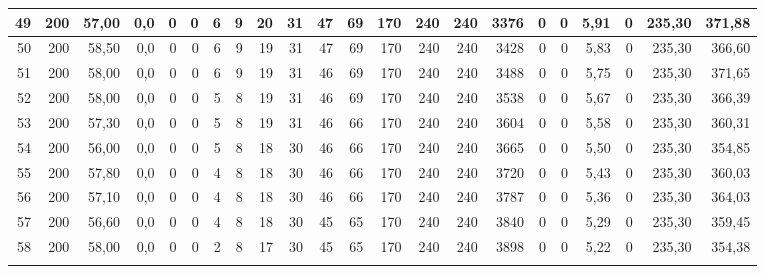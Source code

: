 \begin{appendices}
\begin{table}[H]
{\begin{tabular}{rrrrrrrrrrrrrrrrrrrrrr}
      49 & 200 & 57{,}00 & 0{,}0 & 0  & 0  & 6  & 9  & 20 & 31 & 47  & 69  & 170 & 240 & 240 & 3376 & 0 & 0  & 5{,}91  & 0 & 235{,}30 & 371{,}88 \\ \hline
      50 & 200 & 58{,}50 & 0{,}0 & 0  & 0  & 6  & 9  & 19 & 31 & 47  & 69  & 170 & 240 & 240 & 3428 & 0 & 0  & 5{,}83  & 0 & 235{,}30 & 366{,}60 \\ \hline
      51 & 200 & 58{,}00 & 0{,}0 & 0  & 0  & 6  & 9  & 19 & 31 & 46  & 69  & 170 & 240 & 240 & 3488 & 0 & 0  & 5{,}75  & 0 & 235{,}30 & 371{,}65 \\ \hline
      52 & 200 & 58{,}00 & 0{,}0 & 0  & 0  & 5  & 8  & 19 & 31 & 46  & 69  & 170 & 240 & 240 & 3538 & 0 & 0  & 5{,}67  & 0 & 235{,}30 & 366{,}39 \\ \hline
      53 & 200 & 57{,}30 & 0{,}0 & 0  & 0  & 5  & 8  & 19 & 31 & 46  & 66  & 170 & 240 & 240 & 3604 & 0 & 0  & 5{,}58  & 0 & 235{,}30 & 360{,}31 \\ \hline
      54 & 200 & 56{,}00 & 0{,}0 & 0  & 0  & 5  & 8  & 18 & 30 & 46  & 66  & 170 & 240 & 240 & 3665 & 0 & 0  & 5{,}50  & 0 & 235{,}30 & 354{,}85 \\ \hline
      55 & 200 & 57{,}80 & 0{,}0 & 0  & 0  & 4  & 8  & 18 & 30 & 46  & 66  & 170 & 240 & 240 & 3720 & 0 & 0  & 5{,}43  & 0 & 235{,}30 & 360{,}03 \\ \hline
      56 & 200 & 57{,}10 & 0{,}0 & 0  & 0  & 4  & 8  & 18 & 30 & 46  & 66  & 170 & 240 & 240 & 3787 & 0 & 0  & 5{,}36  & 0 & 235{,}30 & 364{,}03 \\ \hline
      57 & 200 & 56{,}60 & 0{,}0 & 0  & 0  & 4  & 8  & 18 & 30 & 45  & 65  & 170 & 240 & 240 & 3840 & 0 & 0  & 5{,}29  & 0 & 235{,}30 & 359{,}45 \\ \hline
      58 & 200 & 58{,}00 & 0{,}0 & 0  & 0  & 2  & 8  & 17 & 30 & 45  & 65  & 170 & 240 & 240 & 3898 & 0 & 0  & 5{,}22  & 0 & 235{,}30 & 354{,}38 \\ 
      \bighline
    \end{tabular}%
  }
  \label{ev:locust_historial_segundos}
\end{table}

\begin{table}[H]
  \centering
  \small
  \renewcommand{\arraystretch}{1.15}
  \label{ev:locust_fallos}
\end{table}


\end{appendices}
